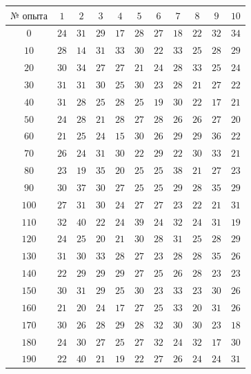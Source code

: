 \documentclass[a4paper,12pt]{article} %
\begin{document}
\begin{tabular}{ | c | c | c | c | c | c | c | c | c | c | c |}
\hline
$\textbf{№ опыта}$ & $1$ & $2$ & $3$ & $4$ & $5$ & $6$ & $7$ & $8$ & $9$ & $10$\\ \hline
$0$ & $24$ & $31$ & $29$ & $17$ & $28$ & $27$ & $18$ & $22$ & $32$ & $34$ \\ \hline
$10$ & $28$ & $14$ & $31$ & $33$ & $30$ & $22$ & $33$ & $25$ & $28$ & $29$\\ \hline
$20$ & $30$ & $34$ & $27$ & $27$ & $21$ & $24$ & $28$ & $33$ & $25$ & $24$\\\hline
$30$ & $31$ & $31$ & $30$ & $25$ & $30$ & $23$ & $28$ & $21$ & $27$ & $22$\\ \hline
$40$ & $31$ & $28$ & $25$ & $28$ & $25$ & $19$ & $30$ & $22$ & $17$ & $21$\\ \hline
$50$ & $24$ & $28$ & $21$ & $28$ & $27$ & $28$ & $26$ & $26$ & $27$ & $20$\\ \hline
$60$ & $21$ & $25$ & $24$ & $15$ & $30$ & $26$ & $29$ & $29$ & $36$ & $22$\\ \hline
$70$ & $26$ & $24$ & $31$ & $30$ & $22$ & $29$ & $22$ & $30$ & $33$ & $21$\\ \hline
$80$ & $23$ & $19$ & $35$ & $20$ & $25$ & $25$ & $38$ & $21$ & $27$ & $23$\\ \hline
$90$ & $30$ & $37$ & $30$ & $27$ & $25$ & $25$ & $29$ & $28$ & $35$ & $29$\\ \hline
$100$ & $27$ & $31$ & $30$ & $24$ & $27$ & $27$ & $23$ & $22$ & $21$ & $31$\\ \hline
$110$ & $32$ & $40$ & $22$ & $24$ & $39$ & $24$ & $32$ & $24$ & $31$ & $19$\\ \hline
$120$ & $24$ & $25$ & $20$ & $21$ & $30$ & $28$ & $31$ & $25$ & $28$ & $29$\\ \hline
$130$ & $31$ & $30$ & $33$ & $28$ & $27$ & $23$ & $28$ & $28$ & $35$ & $26$\\ \hline
$140$ & $22$ & $29$ & $29$ & $29$ & $27$ & $25$ & $26$ & $28$ & $23$ & $23$\\ \hline
$150$ & $30$ & $31$ & $29$ & $25$ & $30$ & $23$ & $33$ & $23$ & $30$ & $26$\\ \hline
$160$ & $21$ & $20$ & $24$ & $17$ & $27$ & $25$ & $33$ & $20$ & $31$ & $26$\\ \hline
$170$ & $30$ & $26$ & $28$ & $29$ & $28$ & $32$ & $30$ & $30$ & $23$ & $18$\\ \hline
$180$ & $24$ & $30$ & $27$ & $25$ & $27$ & $32$ & $24$ & $32$ & $17$ & $30$\\ \hline
$190$ & $22$ & $40$ & $21$ & $19$ & $22$ & $27$ & $26$ & $24$ & $24$ & $31$\\
\hline 
\end{tabular}\\
\end{document}
